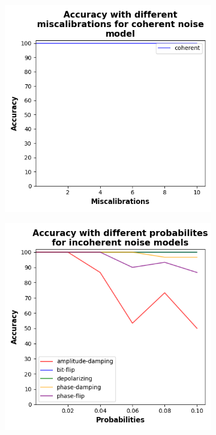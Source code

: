 \begin{figure}[!h]
  \centering

  \begin{subfigure}{0.45\textwidth}
      \includegraphics[width=\linewidth]{figures/evaluation_results/iris/pqc/figures/accuracy-coherent.png}
      \label{fig:iris1}
  \end{subfigure} \qquad
  \begin{subfigure}{0.45\textwidth}
      \includegraphics[width=\linewidth]{figures/evaluation_results/iris/pqc/figures/accuracy-incoherent.png}
      \label{fig:iris2}
  \end{subfigure}


\end{figure}
